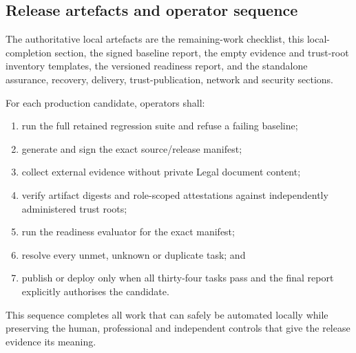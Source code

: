 \subsection{Release artefacts and operator sequence}

The authoritative local artefacts are the remaining-work checklist, this local-
completion section, the signed baseline report, the empty evidence and trust-root
inventory templates, the versioned readiness report, and the standalone assurance,
recovery, delivery, trust-publication, network and security sections.

For each production candidate, operators shall:

\begin{enumerate}
  \item run the full retained regression suite and refuse a failing baseline;
  \item generate and sign the exact source/release manifest;
  \item collect external evidence without private Legal document content;
  \item verify artifact digests and role-scoped attestations against independently
        administered trust roots;
  \item run the readiness evaluator for the exact manifest;
  \item resolve every unmet, unknown or duplicate task; and
  \item publish or deploy only when all thirty-four tasks pass and the final report
        explicitly authorises the candidate.
\end{enumerate}

This sequence completes all work that can safely be automated locally while
preserving the human, professional and independent controls that give the release
evidence its meaning.
